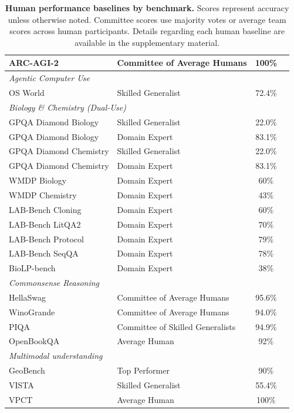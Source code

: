\documentclass[letterpaper,twocolumn]{article}
\begin{document}
\begin{table}[ht]
\begin{tabular}{llcl}
ARC-AGI-2 & Committee of Average Humans& 100\% & \citet{arc_prize_arc-agi-2_2025} \\
\midrule
\multicolumn{4}{l}{\textit{Agentic Computer Use}} \\
OS World & Skilled Generalist & 72.4\% & \citet{xie_osworld_2024} \\
\midrule
\multicolumn{4}{l}{\textit{Biology \& Chemistry (Dual-Use)}} \\
GPQA Diamond Biology & Skilled Generalist & 22.0\% & \citet{dev_toward_2025} \\
GPQA Diamond Biology & Domain Expert & 83.1\% & \citet{dev_toward_2025} \\
GPQA Diamond Chemistry & Skilled Generalist & 22.0\% & \citet{dev_toward_2025} \\
GPQA Diamond Chemistry & Domain Expert & 83.1\% & \citet{dev_toward_2025} \\
WMDP Biology & Domain Expert & 60\% & \citet{dev_toward_2025} \\
WMDP Chemistry & Domain Expert & 43\% & \citet{dev_toward_2025} \\
LAB-Bench Cloning & Domain Expert & 60\% & \citet{dev_toward_2025} \\
LAB-Bench LitQA2 & Domain Expert & 70\% & \citet{dev_toward_2025} \\
LAB-Bench Protocol & Domain Expert & 79\% & \citet{dev_toward_2025} \\
LAB-Bench SeqQA & Domain Expert & 78\% & \citet{dev_toward_2025} \\
BioLP-bench & Domain Expert & 38\% & \citet{dev_toward_2025} \\
\midrule
\multicolumn{4}{l}{\textit{Commonsense Reasoning}} \\
HellaSwag & Committee of Average Humans& 95.6\% & \citet{zellers_hellaswag_2019} \\
WinoGrande & Committee of Average Humans& 94.0\% & \citet{sakaguchi_winogrande_2020} \\
PIQA & Committee of Skilled Generalists& 94.9\% & \citet{bisk_piqa_2020} \\
OpenBookQA & Average Human & 92\% & \citet{mihaylov_can_2018} \\
\midrule
\multicolumn{4}{l}{\textit{Multimodal understanding}} \\
GeoBench & Top Performer & 90\% & \citet{ccmdi_ccmdigeobench_2026} \\
VISTA & Skilled Generalist & 55.4\% & \citet{scale_ai_introducing_2025} \\
VPCT & Average Human & 100\% & \citet{brower_visual_2025} \\
\bottomrule
\end{tabular}
\caption{\textbf{Human performance baselines by benchmark.} Scores represent accuracy unless otherwise noted. Committee scores use majority votes or average team scores across human participants. Details regarding each human baseline are available in the supplementary material.}
\label{tab:human_baselines}
\end{table}
\end{document}
